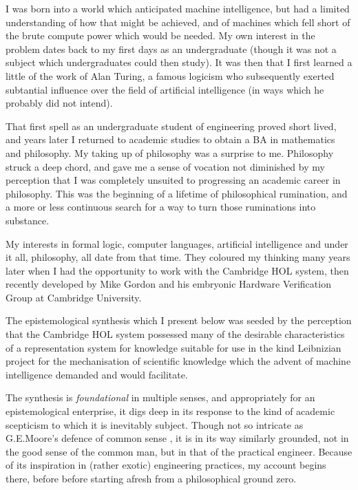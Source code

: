 \documentclass[10pt,titlepage]{book}
\begin{document}
I was born into a world which anticipated machine intelligence, but had a limited understanding of how that might be achieved, and of machines which fell short of the brute compute power which would be needed. 
My own interest in the problem dates back to my first days as an undergraduate (though it was not a subject which undergraduates could then study).
It was then that I first learned a little of the work of Alan Turing, a famous logicism who subsequently exerted subtantial influence over the field of artificial intelligence (in ways which he probably did not intend).

That first spell as an undergraduate student of engineering proved short lived, and years later I returned to academic studies to obtain a BA in mathematics and philosophy.
My taking up of philosophy was a surprise to me.
Philosophy struck a deep chord, and gave me a sense of vocation not diminished by my perception that I was completely unsuited to progressing an academic career in philosophy.
This was the beginning of a lifetime of philosophical rumination, and a more or less continuous search for a way to turn those ruminations into substance.

My interests in formal logic, computer languages, artificial intelligence and under it all, philosophy, all date from that time.
They coloured my thinking many years later when I had the opportunity to work with the Cambridge HOL system, then recently developed by Mike Gordon and his embryonic Hardware Verification Group at Cambridge University.

The epistemological synthesis which I present below was seeded by the perception that the Cambridge HOL system possessed many of the desirable characteristics of a representation system for knowledge suitable for use in the kind Leibnizian project for the mechanisation of scientific knowledge which the advent of machine intelligence demanded and would facilitate.

The synthesis is \emph{foundational} in multiple senses, and appropriately for an epistemological enterprise, it digs deep in its response to the kind of academic scepticism to which it is inevitably subject.
Though not so intricate as G.E.Moore's defence of common sense \cite{moore1925,moore1993}, it is in its way similarly grounded, not in the good sense of the common man, but in that of the practical engineer.
Because of its inspiration in (rather exotic) engineering practices, my account begins there, before before starting afresh from a philosophical ground zero.
\end{document}
